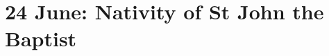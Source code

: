 {
\section{24 June: Nativity of St John the Baptist}
\subtitle{ Class}
\subtitle{I \& II Vespers}
\medskip

\def\deusinadjutoriumsolemn{T}
\def\definevesperspropers{
  \ifthenelse{\boolean{birmingham}}{
    \def\preanttranslationone{\vspace{-0.3\baselineskip}}
    \def\prepsalmtitleone{\vspace{-0.2\baselineskip}}
    \def\postpsalmtitlethree{\needspace{10\baselineskip}}
  }{
    \ifthenelse{\boolean{stlouis}}{
      \def\prepsalmtitleone{\bigskip\bigskip}
      \def\postpsalmtitleone{\bigskip}
      \def\prepsalmtitletwo{\bigskip}
    }{
      \def\prepsalmtitlethree{\bigskip}
      \def\preantfour{\bigskip}
    }
    \def\prepsalmtitlefour{\needspace{14\baselineskip}}
  }
}
\def\definevesperspropersalt{
  \def\preantthree{\needspace{8\baselineskip}}
  \ifthenelse{\boolean{birmingham}}{
    \def\prepsalmtwoverses{\oldneedspace{6\baselineskip}}
    \def\prepsalmtitlethree{\vspace{-0.5\baselineskip}}
    \def\preantfive{\needspace{12\baselineskip}}  
  }
  {
    \ifthenelse{\boolean{stlouis}}{
      \def\prepsalmtitleone{\oldneedspace{10\baselineskip}}
      \def\prepsalmtitlethree{\vspace{-1\baselineskip}}
    }{
      \def\prepsalmtitletwo{\vspace{-0.5\baselineskip}}
      \def\preantfour{\bigskip}
    }
  }
}
\def\vesperspropersnote{At II Vespers:}
\def\vesperspropersaltnote{\needspace{15\baselineskip}At I Vespers:}
\def\prevesperspsalms{\noindent\printnote{Chapter and following, page \pageref{june24-chapter}.}
\medskip
\hrule
\medskip
}
\def\vesperspsalmslabel{\label{june24-2vespers}}
\def\prevesperspsalmsalt{\noindent\printnote{II Vespers psalms and antiphons, page \pageref{june24-2vespers}.}\medskip\label{june24-1vespers}}
\def\prechapter{\label{june24-chapter}}

}

